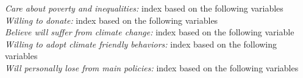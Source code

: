 \documentclass{article}
\begin{document}
\textit{Care about poverty and inequalities:} index based on the following variables\\
\textit{Willing to donate:} index based on the following variables\\
\textit{Believe will suffer from climate change:} index based on the following variable\\
\textit{Willing to adopt climate friendly behaviors:} index based on the following variables\\
\textit{Will personally lose from main policies:} index based on the following variables\\
\end{document}
